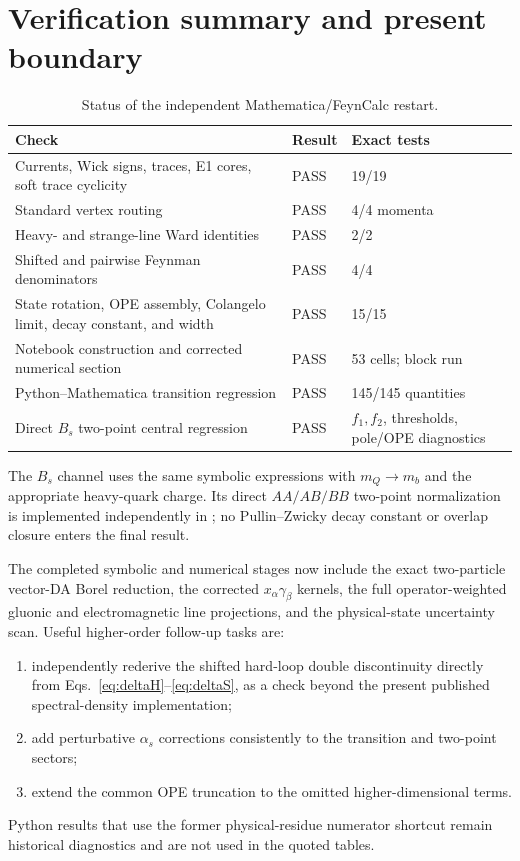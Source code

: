 \documentclass[11pt]{article}
\begin{document}
\section{Verification summary and present boundary}

\begin{table}[H]
  \centering
  \renewcommand{\arraystretch}{1.12}
  \begin{tabular}{p{}p{}p{}}
    \toprule
    Check & Result & Exact tests\\
    \midrule
    Currents, Wick signs, traces, E1 cores, soft trace cyclicity
      & PASS & 19/19\\
    Standard vertex routing
      & PASS & 4/4 momenta\\
    Heavy- and strange-line Ward identities
      & PASS & 2/2\\
    Shifted and pairwise Feynman denominators
      & PASS & 4/4\\
    State rotation, OPE assembly, Colangelo limit, decay constant, and width
      & PASS & 15/15\\
    Notebook construction and corrected numerical section
      & PASS & 53 cells; block run\\
    Python--Mathematica transition regression
      & PASS & 145/145 quantities\\
    Direct $B_s$ two-point central regression
      & PASS & $f_1,f_2$, thresholds, pole/OPE diagnostics\\
    \bottomrule
  \end{tabular}
  \caption{Status of the independent Mathematica/FeynCalc restart.}
\end{table}

The $B_s$ channel uses the same symbolic expressions with $m_Q\to m_b$ and
the appropriate heavy-quark charge.  Its direct $AA/AB/BB$ two-point
normalization is implemented independently in
; no
Pullin--Zwicky decay constant or overlap closure enters the final result.

The completed symbolic and numerical stages now include the exact
two-particle vector-DA Borel reduction, the corrected
$x_\alpha\gamma_\beta$ kernels, the full operator-weighted gluonic and
electromagnetic line projections, and the physical-state uncertainty scan.
Useful higher-order follow-up tasks are:
\begin{enumerate}
  \item independently rederive the shifted hard-loop double discontinuity
    directly from Eqs.~\eqref{eq:deltaH}--\eqref{eq:deltaS}, as a check beyond
    the present published spectral-density implementation;
  \item add perturbative $\alpha_s$ corrections consistently to the transition
    and two-point sectors;
  \item extend the common OPE truncation to the omitted higher-dimensional
    terms.
\end{enumerate}
Python results that use the former physical-residue numerator shortcut remain
historical diagnostics and are not used in the quoted tables.
\end{document}
